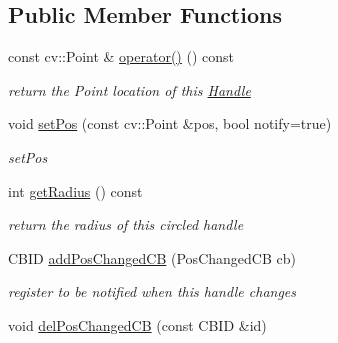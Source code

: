 \subsection*{Public Member Functions}
\begin{DoxyCompactItemize}
\item 
const cv\+::\+Point \& \hyperlink{classcanvascv_1_1Handle_af7f37f216c87e0ddb0c3028308a0ac08}{operator()} () const \hypertarget{classcanvascv_1_1Handle_af7f37f216c87e0ddb0c3028308a0ac08}{}\label{classcanvascv_1_1Handle_af7f37f216c87e0ddb0c3028308a0ac08}

\begin{DoxyCompactList}\small\item\em return the Point location of this \hyperlink{classcanvascv_1_1Handle}{Handle} \end{DoxyCompactList}\item 
void \hyperlink{classcanvascv_1_1Handle_a57758e2de29de462f4bda5f7a50b0c96}{set\+Pos} (const cv\+::\+Point \&pos, bool notify=true)
\begin{DoxyCompactList}\small\item\em set\+Pos \end{DoxyCompactList}\item 
int \hyperlink{classcanvascv_1_1Handle_a549813832ba1514040a0bf2c9397f10d}{get\+Radius} () const \hypertarget{classcanvascv_1_1Handle_a549813832ba1514040a0bf2c9397f10d}{}\label{classcanvascv_1_1Handle_a549813832ba1514040a0bf2c9397f10d}

\begin{DoxyCompactList}\small\item\em return the radius of this circled handle \end{DoxyCompactList}\item 
C\+B\+ID \hyperlink{classcanvascv_1_1Handle_adf028dcb7c12a711351d9a5794b1df69}{add\+Pos\+Changed\+CB} (Pos\+Changed\+CB cb)\hypertarget{classcanvascv_1_1Handle_adf028dcb7c12a711351d9a5794b1df69}{}\label{classcanvascv_1_1Handle_adf028dcb7c12a711351d9a5794b1df69}

\begin{DoxyCompactList}\small\item\em register to be notified when this handle changes \end{DoxyCompactList}\item 
void \hyperlink{classcanvascv_1_1Handle_a9d81b805be12d424bc59cbb7f73745ea}{del\+Pos\+Changed\+CB} (const C\+B\+ID \&id)\hypertarget{classcanvascv_1_1Handle_a9d81b805be12d424bc59cbb7f73745ea}{}\label{classcanvascv_1_1Handle_a9d81b805be12d424bc59cbb7f73745ea}


\end{DoxyCompactItemize}
